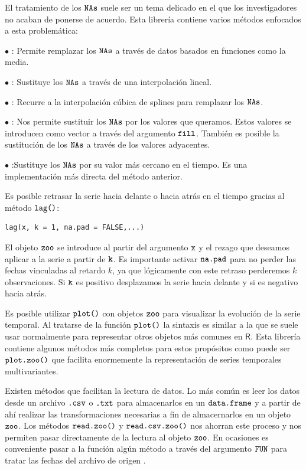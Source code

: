 El tratamiento de los $\verb!NAs!$ suele ser un tema delicado en el que los investigadores no acaban de ponerse de acuerdo. Esta librería contiene varios métodos enfocados a esta problemática:
\begin{itemize*}
  \item[$\bullet$] : Permite remplazar los  $\verb!NAs!$ a través de datos basados en funciones como la media.
  \item[$\bullet$] : Sustituye los $\verb!NAs!$ a través de una interpolación lineal.
  \item[$\bullet$] : Recurre a la interpolación cúbica de splines para remplazar los $\verb!NAs!$.
  \item[$\bullet$] : Nos permite sustituir los $\verb!NAs!$ por los valores que queramos. Estos valores se introducen como vector a través del argumento $\verb!fill!$. También es posible la sustitución de los $\verb!NAs!$ a través de los valores adyacentes.
  \item[$\bullet$] :Sustituye los $\verb!NAs!$ por su valor más cercano en el tiempo. Es una implementación más directa del método anterior.
\end{itemize*}

Es posible retrasar la serie hacia delante o hacia atrás en el tiempo gracias al método $\verb!lag()!$:
\begin{Verbatim}[fontsize=\footnotesize]
lag(x, k = 1, na.pad = FALSE,...)
\end{Verbatim}

El objeto $\verb!zoo!$ se introduce al partir del argumento $\verb!x!$ y el rezago que deseamos aplicar a la serie a partir de $\verb!k!$. Es importante activar $\verb!na.pad!$ para no perder las fechas vinculadas al retardo $k$, ya que lógicamente con este retraso perderemos $k$ observaciones. Si $\verb!k!$ es positivo desplazamos la serie hacia delante y si es negativo hacia atrás.

Es posible utilizar $\verb!plot()!$ con objetos $\verb!zoo!$ para visualizar la evolución de la serie temporal. Al tratarse de la función $\verb!plot()!$ la sintaxis es similar a la que se suele usar normalmente para representar otros objetos más comunes en $\textsf{R}$. Esta librería contiene algunos métodos más completos para estos propósitos como puede ser $\verb!plot.zoo()!$ que facilita enormemente la representación de series temporales multivariantes.

Existen métodos que facilitan la lectura de datos. Lo más común es leer los datos desde un archivo $\verb!.csv!$ o $\verb!.txt!$ para almacenarlos en un $\verb!data.frame!$ y a partir de ahí realizar las transformaciones necesarias a fin de almacernarlos en un objeto $\verb!zoo!$. Los métodos $\verb!read.zoo()!$ y $\verb!read.csv.zoo()!$ nos ahorran este proceso y nos permiten pasar directamente de la lectura al objeto $\verb!zoo!$. En ocasiones es conveniente pasar a la función algún método a través del argumento $\verb!FUN!$ para tratar las fechas del archivo de origen .

